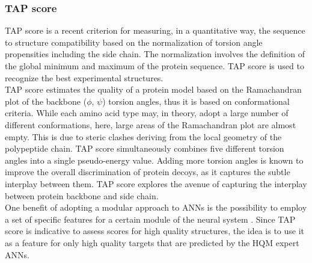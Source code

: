 \subsubsection{TAP score}
\label{subsubsec:tap_score}
TAP score \cite{Tosatto2007aa} is a recent criterion for measuring, in a quantitative way, the sequence to structure compatibility based on the normalization of torsion angle propensities including the side chain. The normalization involves the definition of the global minimum and maximum of the protein sequence. TAP score is used to recognize the best experimental structures.\\
TAP score estimates the quality of a protein model based on the Ramachandran plot of the backbone ($\phi$, $\psi$) torsion angles, thus it is based on conformational criteria. While each amino acid type may, in theory, adopt a large number of different conformations, here, large areas of the Ramachandran plot are almost empty. This is due to steric clashes deriving from the local geometry of the polypeptide chain. TAP score simultaneously combines five different torsion angles into a single pseudo-energy value. Adding more torsion angles is known to improve the overall discrimination of protein decoys, as it captures the subtle interplay between them. TAP score explores the avenue of capturing the interplay between protein backbone and side chain. \\
One benefit of adopting a modular approach to ANNs is the possibility to employ a set of specific features for a certain module of the neural system \cite{Happel1994aa}. Since TAP score is indicative to assess scores for high quality structures, the idea is to use it as a feature for only high quality targets that are predicted by the HQM expert ANNs.



\cleardoublepage
